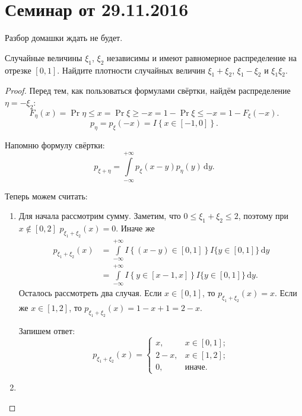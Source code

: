 \section{Семинар от 29.11.2016}
Разбор домашки ждать не будет.
\begin{problem}
	Случайные величины \(\xi_1\), \(\xi_2\) независимы и имеют равномерное распределение на отрезке \([0, 1]\). Найдите плотности случайных величин \(\xi_1 + \xi_2\), \(\xi_1 - \xi_2\) и \(\xi_1\xi_2\).
\end{problem}
\begin{proof}
	Перед тем, как пользоваться формулами свёртки, найдём распределение \(\eta = -\xi_2\):
	\[F_{\eta}(x) = \Pr{\eta \leq x} = \Pr{\xi \geq -x} = 1 - \Pr{\xi \leq -x} = 1 - F_{\xi}(-x).\]
	\[p_{\eta} = p_{\xi}(-x) = I\left\{x \in [-1, 0]\right\}.\]
	
	Напомню формулу свёртки:
	\[p_{\xi + \eta} = \int\limits_{-\infty}^{+\infty} p_{\xi}(x - y)p_{\eta}(y)\,\mathrm{d}y.\]
	
	Теперь можем считать:
	\begin{enumerate}
		\item Для начала рассмотрим сумму. Заметим, что \(0 \leq \xi_1 + \xi_2 \leq 2\), поэтому при \(x \not\in [0, 2]\) \(p_{\xi_1 + \xi_2}(x) = 0\). Иначе же
		\begin{align}
			p_{\xi_1 + \xi_2}(x) &= \int\limits_{-\infty}^{+\infty} I\left\{(x - y) \in [0, 1]\right\}I\{y \in [0, 1]\}\,\mathrm{d}y \\
			&= \int\limits_{-\infty}^{+\infty} I\left\{y \in [x - 1, x]\right\}I\{y \in [0, 1]\}\,\mathrm{d}y.
		\end{align}
		Осталось рассмотреть два случая. Если \(x \in [0, 1]\), то \(p_{\xi_1 + \xi_2}(x) = x\). Если же \(x \in [1, 2]\), то \(p_{\xi_1 + \xi_2}(x) = 1 - x + 1 = 2 - x\).
		
		Запишем ответ:
		\[p_{\xi_1 + \xi_2}(x) = \begin{cases}
		x,& x \in [0, 1]; \\
		2 - x,& x \in [1, 2]; \\
		0,& \text{иначе}.
		\end{cases}\]
		
		\item 
	\end{enumerate}
\end{proof}